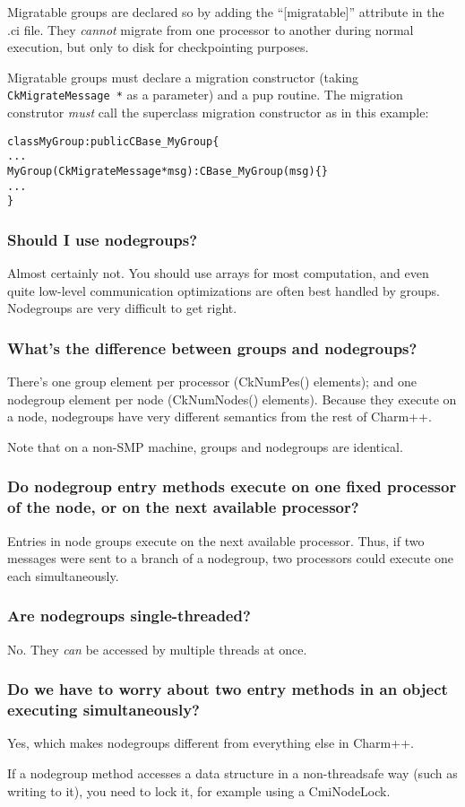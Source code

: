 Migratable groups are declared so by adding the ``[migratable]'' attribute in
the .ci file. They {\em cannot} migrate from one processor to another during
normal execution, but only to disk for checkpointing purposes.

Migratable groups must declare a migration constructor (taking
{\tt CkMigrateMessage *} as a parameter) and a pup routine. The migration
construtor {\em must} call the superclass migration constructor as in this
example:
\begin{alltt}
class MyGroup : public CBase\_MyGroup \{
  ...
  MyGroup (CkMigrateMessage *msg) : CBase\_MyGroup(msg) \{ \}
  ...
\}
\end{alltt}

\subsubsection{Should I use nodegroups?}

Almost certainly not. You should use arrays for most computation, and
even quite low-level communication optimizations are often best handled
by groups. Nodegroups are very difficult to get right.

\subsubsection{What's the difference between groups and nodegroups?}

There's one group element per processor (CkNumPes() elements); and
one nodegroup element per node (CkNumNodes() elements). Because they
execute on a node, nodegroups have very different semantics from the rest
of Charm++.

Note that on a non-SMP machine, groups and nodegroups are identical.


\subsubsection{Do nodegroup entry methods execute on one fixed processor of the node,
or on the next available processor?}

Entries in node groups execute on the next available processor. Thus,
if two messages were sent to a branch of a nodegroup, two processors could
execute one each simultaneously.

\subsubsection{Are nodegroups single-threaded?}

No. They {\em can} be accessed by multiple threads at once.

\subsubsection{Do we have to worry about two entry methods in an object executing simultaneously?}

Yes, which makes nodegroups different from everything else in Charm++.

If a nodegroup method accesses a data structure in a non-threadsafe
way (such as writing to it), you need to lock it, for example using a CmiNodeLock.
